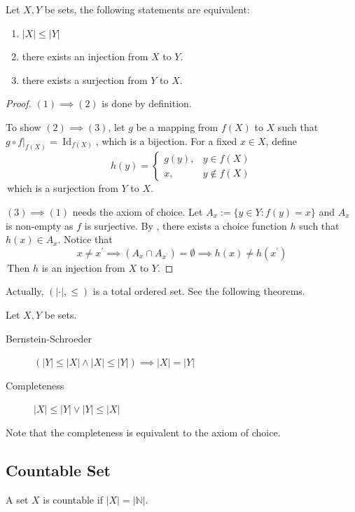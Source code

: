 \begin{proposition} \label{prop: cardinality_equivalence}
    Let $X, Y$ be sets, the following statements are equivalent:
    \begin{enumerate}
        \item $|X|\leq|Y|$
        \item there exists an injection from $X$ to $Y$.
        \item there exists a surjection from $Y$ to $X$.
    \end{enumerate}
\end{proposition}
\begin{proof}
    $(1)\implies (2)$ is done by definition. 
    
    To show $(2)\implies (3)$, let $g$ be a mapping from $f(X)$ to $X$ such that $g\circ f|_{f(X)} = \operatorname{Id}_{f(X)}$, which is a bijection. For a fixed $x \in X$, define
$$h(y)= \begin{cases}
    g(y), & y \in f(X)\\
    x, & y \notin f(X)
\end{cases}$$
\,which is a surjection from $Y$ to $X$.

$(3)\implies (1)$ needs the axiom of choice. Let $A_x := \{y \in Y : f(y) = x \}$ and $A_x$ is non-empty as $f$ is surjective. 
By , there exists a choice function $h$ such that $h(x) \in A_x$. Notice that
$$x\neq x^\prime \implies (A_x \cap A_{x^{\prime}})=\emptyset \implies h(x) \neq h(x^\prime)$$
\,Then $h$ is an injection from $X$ to $Y$.
\end{proof}

Actually, $(|\cdot|, \leq)$ is a total ordered set. See the following theorems.
\begin{theorem} 
Let $X,Y$ be sets.
\begin{description}
    \item[Bernstein-Schroeder] $(|Y|\leq |X| \land |X|\leq |Y|) \implies |X|=|Y|$
    \item[Completeness] $|X| \leq |Y| \lor |Y| \leq |X|$
\end{description}    
\end{theorem}
\begin{note}
    Note that the completeness is equivalent to the axiom of choice.
\end{note}

\subsection{Countable Set}
\begin{definition}[Countability]
    A set $X$ is countable if $|X|=|\mathbb{N}|$.
\end{definition}

